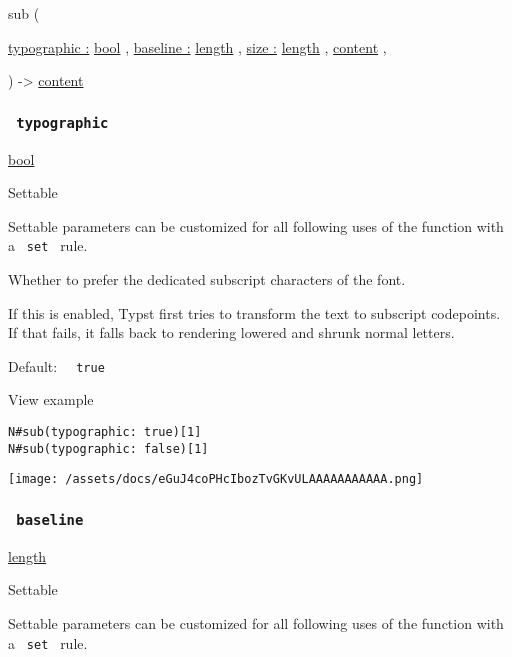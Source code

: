 { sub } (

{ \hyperref[parameters-typographic]{typographic :}
\href{/docs/reference/foundations/bool/}{bool} , } {
\hyperref[parameters-baseline]{baseline :}
\href{/docs/reference/layout/length/}{length} , } {
\hyperref[parameters-size]{size :}
\href{/docs/reference/layout/length/}{length} , } {
\href{/docs/reference/foundations/content/}{content} , }

) -\textgreater{} \href{/docs/reference/foundations/content/}{content}

\subsubsection{\texorpdfstring{\texttt{\ typographic\ }}{ typographic }}\label{parameters-typographic}

\href{/docs/reference/foundations/bool/}{bool}

{{ Settable }}

\label{parameters-typographic-settable-tooltip}
Settable parameters can be customized for all following uses of the
function with a \texttt{\ set\ } rule.

Whether to prefer the dedicated subscript characters of the font.

If this is enabled, Typst first tries to transform the text to subscript
codepoints. If that fails, it falls back to rendering lowered and shrunk
normal letters.

Default: \texttt{\ }{\texttt{\ true\ }}\texttt{\ }


View example

\begin{verbatim}
N#sub(typographic: true)[1]
N#sub(typographic: false)[1]
\end{verbatim}

\texttt{[image: /assets/docs/eGuJ4coPHcIbozTvGKvULAAAAAAAAAAA.png]}

\subsubsection{\texorpdfstring{\texttt{\ baseline\ }}{ baseline }}\label{parameters-baseline}

\href{/docs/reference/layout/length/}{length}

{{ Settable }}

\label{parameters-baseline-settable-tooltip}
Settable parameters can be customized for all following uses of the
function with a \texttt{\ set\ } rule.

